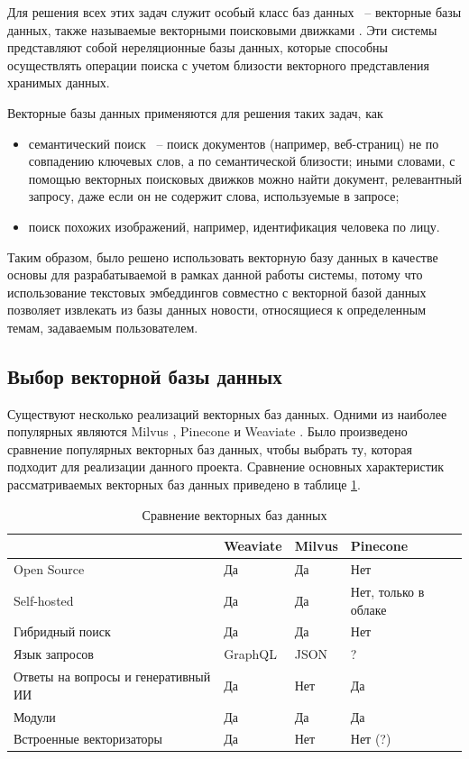 Для решения всех этих задач служит особый класс баз данных ~-- векторные базы данных, также называемые векторными поисковыми движками \cite{vector-search}. Эти системы представляют собой нереляционные базы данных, которые способны осуществлять операции поиска с учетом близости векторного представления хранимых данных.

Векторные базы данных применяются для решения таких задач, как
\begin{itemize}
    \item семантический поиск ~-- поиск документов (например, веб-страниц) не по совпадению ключевых слов, а по семантической близости; иными словами, с помощью векторных поисковых движков можно найти документ, релевантный запросу, даже если он не содержит слова, используемые в запросе;
    \item поиск похожих изображений, например, идентификация человека по лицу.
\end{itemize}

Таким образом, было решено использовать векторную базу данных в качестве основы для разрабатываемой в рамках данной работы системы, потому что использование текстовых эмбеддингов совместно с векторной базой данных позволяет извлекать из базы данных новости, относящиеся к определенным темам, задаваемым пользователем.

\subsection{Выбор векторной базы данных}

Существуют несколько реализаций векторных баз данных. Одними из наиболее популярных являются Milvus \cite{milvus}, Pinecone \cite{pinecone} и Weaviate \cite{weaviate}. Было произведено сравнение популярных векторных баз данных, чтобы выбрать ту, которая подходит для реализации данного проекта. Сравнение основных характеристик рассматриваемых векторных баз данных приведено в таблице \ref{tab:vector-db-compare}.

\begin{table}[ht]
    \caption{Сравнение векторных баз данных}
    \label{tab:vector-db-compare}
    \begin{tabularx}{\textwidth}{|l|X|X|X|}
        \hline
        & Weaviate & Milvus & Pinecone \\
        \hline
        Open Source & Да & Да & Нет \\
        \hline
        Self-hosted & Да & Да & Нет, только в облаке \\
        \hline
        Гибридный поиск & Да & Да & Нет \\
        \hline
        Язык запросов & GraphQL & JSON &  ? \\
        \hline
        Ответы на вопросы и генеративный ИИ & Да & Нет & Да \\
        \hline
        Модули & Да & Да & Да \\
        \hline
        Встроенные векторизаторы & Да & Нет & Нет (?) \\
        \hline
    \end{tabularx}
\end{table}

